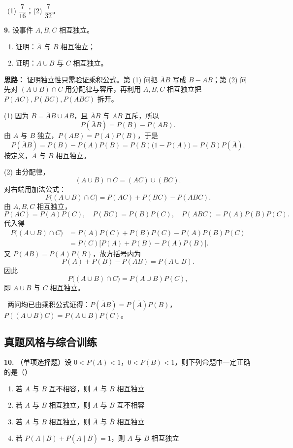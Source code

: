 \ (1) $\dfrac{7}{16}$；(2) $\dfrac{7}{32}$。

\else \answerarea[10] \fi%

\textbf{9.} 设事件 $A,B,C$ 相互独立。
\begin{enumerate}[label=(\arabic*)]
    \item 证明：$\bar A$ 与 $B$ 相互独立；
    \item 证明：$A\cup B$ 与 $C$ 相互独立。
\end{enumerate}

\ifshowsolutions%
\textbf{思路：} 证明独立性只需验证乘积公式。第 (1) 问把 $\bar A B$ 写成 $B-AB$；第 (2) 问先对 $(A\cup B)\cap C$ 用分配律与容斥，再利用 $A,B,C$ 相互独立把 $P(AC),P(BC),P(ABC)$ 拆开。

(1) 因为 $B=\bar AB\cup AB$，且 $\bar AB$ 与 $AB$ 互斥，所以
\[
P(\bar AB)=P(B)-P(AB).
\]
由 $A$ 与 $B$ 独立，$P(AB)=P(A)P(B)$，于是
\[
P(\bar AB)=P(B)-P(A)P(B)=P(B)\bigl(1-P(A)\bigr)=P(B)P(\bar A).
\]
按定义，$\bar A$ 与 $B$ 相互独立。

(2) 由分配律，
\[
(A\cup B)\cap C=(AC)\cup(BC).
\]
对右端用加法公式：
\[
P\bigl((A\cup B)\cap C\bigr)=P(AC)+P(BC)-P(ABC).
\]
由 $A,B,C$ 相互独立，
\[
P(AC)=P(A)P(C),\quad P(BC)=P(B)P(C),\quad P(ABC)=P(A)P(B)P(C).
\]
代入得
\[
\begin{aligned}
P\bigl((A\cup B)\cap C\bigr)
&=P(A)P(C)+P(B)P(C)-P(A)P(B)P(C)\\
&=P(C)\bigl[P(A)+P(B)-P(A)P(B)\bigr].
\end{aligned}
\]
又 $P(AB)=P(A)P(B)$，故方括号内为
\[
P(A)+P(B)-P(AB)=P(A\cup B).
\]
因此
\[
P\bigl((A\cup B)\cap C\bigr)=P(A\cup B)P(C),
\]
即 $A\cup B$ 与 $C$ 相互独立。

\ 两问均已由乘积公式证得：$P(\bar AB)=P(\bar A)P(B)$，$P((A\cup B)C)=P(A\cup B)P(C)$。

\else \answerarea[10] \fi%

\subsection{真题风格与综合训练}

\textbf{10.} （单项选择题）设 $0<P(A)<1$，$0<P(B)<1$，则下列命题中一定正确的是（\quad）
\begin{enumerate}[label=(\Alph*)]
    \item 若 $A$ 与 $B$ 互不相容，则 $A$ 与 $B$ 相互独立
    \item 若 $A$ 与 $B$ 相互独立，则 $A$ 与 $B$ 互不相容
    \item 若 $A$ 与 $B$ 相互独立，则 $\bar A$ 与 $\bar B$ 相互独立
    \item 若 $P(A\mid B)+P(A\mid\bar B)=1$，则 $A$ 与 $B$ 相互独立
\end{enumerate}

